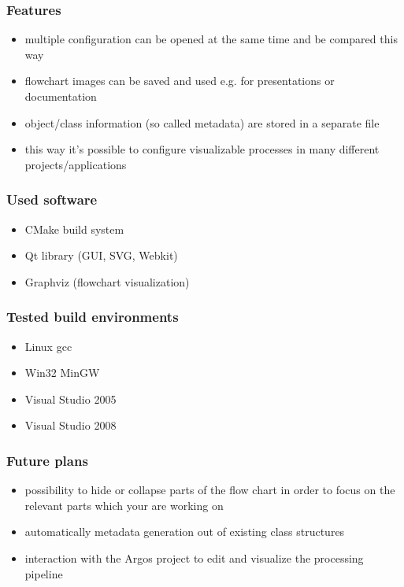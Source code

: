\documentclass[17pt,notes=hide,amsmath=namelimits,sumlimits,intlimits]{beamer}
\begin{document}
\begin{frame}
  \frametitle{Features}
  \begin{itemize}
    \item multiple configuration can be opened at the same time and be
	  compared this way
    \item flowchart images can be saved and used e.g. for presentations
	  or documentation
    \item object/class information (so called metadata) are stored in a
	  separate file
	\item this way it's possible to configure visualizable
	  processes in many different projects/applications
  \end{itemize}
\end{frame}

\begin{frame}
  \frametitle{Used software}
  \begin{itemize}
    \item CMake build system
    \item Qt library (GUI, SVG, Webkit)
    \item Graphviz (flowchart visualization)
  \end{itemize}
\end{frame}

\begin{frame}
  \frametitle{Tested build environments}
  \begin{itemize}
    \item Linux gcc
    \item Win32 MinGW
    \item Visual Studio 2005
    \item Visual Studio 2008
  \end{itemize}
\end{frame}

\begin{frame}
  \frametitle{Future plans}
  \begin{itemize}
    \item possibility to hide or collapse parts of the
	  flow chart in order to focus on the relevant
	  parts which your are working on
    \item automatically metadata generation out of
	  existing class structures
    \item interaction with the Argos project to edit
	  and visualize the processing pipeline
  \end{itemize}
\end{frame}
\end{document}
